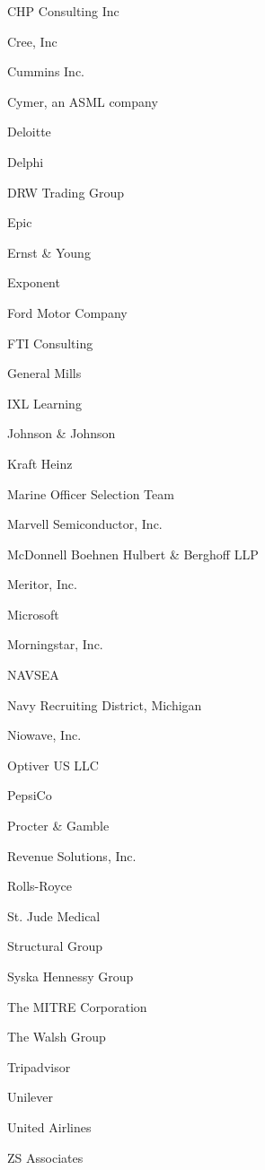 \documentclass[twoside]{article}
\begin{document}
\begin{center}
\begin{multicols}{5}
\begin{FlushLeft}
\begin{compactitem}
\item CHP Consulting Inc
\item Cree, Inc
\item Cummins Inc.
\item Cymer, an ASML company
\item Deloitte
\item Delphi
\item DRW Trading Group
\item Epic
\item Ernst \& Young
\item Exponent
\item Ford Motor Company
\item FTI Consulting
\item General Mills
\item IXL Learning
\item Johnson \& Johnson
\item Kraft Heinz
\item Marine Officer Selection Team
\item Marvell Semiconductor, Inc.
\item McDonnell Boehnen Hulbert \& Berghoff LLP
\item Meritor, Inc.
\item Microsoft
\item Morningstar, Inc.
\item NAVSEA
\item Navy Recruiting District, Michigan
\item Niowave, Inc.
\item Optiver US LLC
\item PepsiCo
\item Procter \& Gamble
\item Revenue Solutions, Inc.
\item Rolls-Royce
\item St. Jude Medical
\item Structural Group
\item Syska Hennessy Group
\item The MITRE Corporation
\item The Walsh Group
\item Tripadvisor
\item Unilever
\item United Airlines
\item ZS Associates
\end{compactitem}
        \end{FlushLeft}
        \vspace{1em}

\end{multicols}
\end{center}
\end{document}
